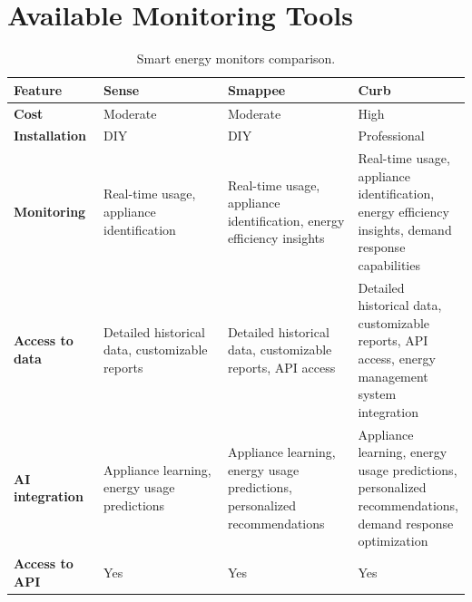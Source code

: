 

\chapter{Available Monitoring Tools}
\label{available-monitoring-tools}

{\renewcommand{\arraystretch}{2}%
\begin{table}[ht]
    \caption{Smart energy monitors comparison.}
    \label{tab:smart-energy-monitors-comparison}
    \hskip-1.8cm\begin{tabular}{p{0.2\linewidth} | p{0.3\linewidth} | p{0.3\linewidth} | p{0.3\linewidth}}
    \textbf{Feature}        & \textbf{Sense} \cite{Sense2024}                & \textbf{Smappee} \cite{Smappee2024}                                        & \textbf{Curb} \cite{Elevation2024}                                                                       \\ \midrule
    \textbf{Cost}           & Moderate                                       & Moderate                                                                   & High                                                                                                     \\
    \textbf{Installation}   & DIY                                            & DIY                                                                        & Professional                                                                                             \\
    \textbf{Monitoring}     & Real-time usage, appliance identification      & Real-time usage, appliance identification, energy efficiency insights      & Real-time usage, appliance identification, energy efficiency insights, demand response capabilities      \\
    \textbf{Access to data} & Detailed historical data, customizable reports & Detailed historical data, customizable reports, API access                 & Detailed historical data, customizable reports, API access, energy management system integration         \\
    \textbf{AI integration} & Appliance learning, energy usage predictions   & Appliance learning, energy usage predictions, personalized recommendations & Appliance learning, energy usage predictions, personalized recommendations, demand response optimization \\
    \textbf{Access to API}  & Yes                                            & Yes                                                                        & Yes                                                                                                      \\

\end{tabular}
\end{table}}

